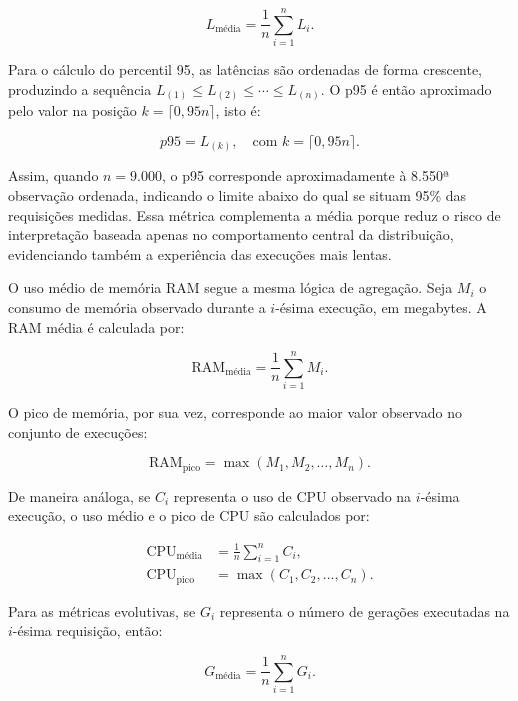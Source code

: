 \begin{equation}
L_{\text{média}} = \frac{1}{n}\sum_{i=1}^{n} L_i.
\end{equation}

Para o cálculo do percentil 95, as latências são ordenadas de forma crescente, produzindo a sequência \(L_{(1)} \leq L_{(2)} \leq \cdots \leq L_{(n)}\). O p95 é então aproximado pelo valor na posição \(k = \lceil 0{,}95n \rceil\), isto é:

\begin{equation}
p95 = L_{(k)}, \quad \text{com } k = \lceil 0{,}95n \rceil.
\end{equation}

Assim, quando \(n = 9.000\), o p95 corresponde aproximadamente à 8.550ª observação ordenada, indicando o limite abaixo do qual se situam 95\% das requisições medidas. Essa métrica complementa a média porque reduz o risco de interpretação baseada apenas no comportamento central da distribuição, evidenciando também a experiência das execuções mais lentas.

O uso médio de memória RAM segue a mesma lógica de agregação. Seja \(M_i\) o consumo de memória observado durante a \(i\)-ésima execução, em megabytes. A RAM média é calculada por:

\begin{equation}
\text{RAM}_{\text{média}} = \frac{1}{n}\sum_{i=1}^{n} M_i.
\end{equation}

O pico de memória, por sua vez, corresponde ao maior valor observado no conjunto de execuções:

\begin{equation}
\text{RAM}_{\text{pico}} = \max(M_1, M_2, \ldots, M_n).
\end{equation}

De maneira análoga, se \(C_i\) representa o uso de CPU observado na \(i\)-ésima execução, o uso médio e o pico de CPU são calculados por:

\begin{align}
\text{CPU}_{\text{média}} &= \frac{1}{n}\sum_{i=1}^{n} C_i,\\
\text{CPU}_{\text{pico}} &= \max(C_1, C_2, \ldots, C_n).
\end{align}

Para as métricas evolutivas, se \(G_i\) representa o número de gerações executadas na \(i\)-ésima requisição, então:

\begin{equation}
G_{\text{média}} = \frac{1}{n}\sum_{i=1}^{n} G_i.
\end{equation}

